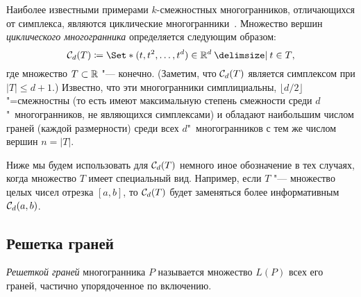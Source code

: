 Наиболее известными примерами $k$-смежностных многогранников, отличающихся от симплекса, являются циклические многогранники~\cite{Grunbaum:2003,Emelichev:1981,ZieglerBook}.
Множество вершин \emph{циклического многогранника} определяется следующим образом:
\label{page:cyclic}
\[
\CP_d(T) \coloneqq \Set*{(t, t^2, \dots, t^d) \in \R^d \given t \in T},
\]
где множество $T \subset \mathbb{R}$ "--- конечно.
(Заметим, что ${\mathcal C}_d(T)$ является симплексом при $|T| \le d+1$.)
Известно, что эти многогранники симплициальны, $\lfloor d/2\rfloor$"=смежностны
(то есть имеют максимальную степень смежности среди $d$"~многогранников, не являющихся симплексами)
и обладают наибольшим числом граней (каждой размерности) среди всех $d$"~многогранников с тем же числом вершин $n = |T|$.

Ниже мы будем использовать для ${\mathcal C}_d(T)$ немного иное обозначение в тех случаях, когда множество $T$ имеет специальный вид.
Например, если $T$ "--- множество целых чисел отрезка $[a,b]$, 
то ${\mathcal C}_d(T)$ будет заменяться более информативным ${\mathcal C}_d(a, b)$.

\begin{comment}
Одной из самых простых и вместе с тем весьма полезных операций над многогранниками является операция образования пирамиды.
Пусть $P$ "--- некоторый $d$-многогранник, вложенный в пространство $\R^n$, $n > d$,
и~пусть точка $\bm{x} \in \R^n$ не~принадлежит аффинной оболочке этого многогранника.
\emph{Пирамидой} над $P$ называется выпуклая оболочка $\conv\{P\cup \bm{x}\}$.
Многогранник $P$ называется \emph{основанием} пирамиды $\conv\{P\cup \bm{x}\}$, а точка $\bm{x}$ "--- ее \emph{апексом} (или \emph{вершиной пирамиды}).
Гранями пирамиды являются все грани ее основания, а также все пирамиды над его гранями.
В частности, число гиперграней пирамиды ровно на единицу больше числа гиперграней основания, то же верно и для числа вершин.
Пирамида над симплициальным многогранником также является симплициальным многогранником.
Пирамида над $k$-смежностным многогранником тоже $k$-смежностна.
\end{comment}


\subsection{Решетка граней}

\emph{Решеткой граней} многогранника $P$ называется множество $L(P)$ всех его граней, 
частично упорядоченное по включению.

